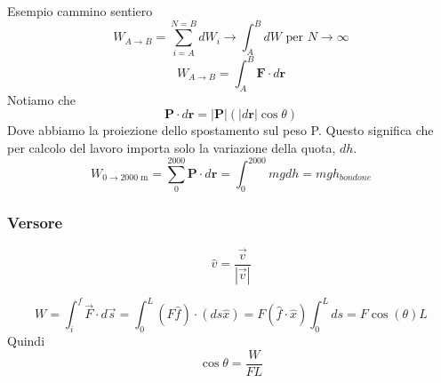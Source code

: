 Esempio cammino sentiero
\[ W_{A\to B} = \sum_{i = A}^{N = B}dW_i \to \int_{A}^{B}dW \text{ per } N\to\infty \]
\[ W_{A\to B} = \int_{A}^{B}\textbf{F}\cdot d\textbf{r} \]
Notiamo che 
\[ \textbf{P}\cdot d\textbf{r} = |\textbf{P}| (|d\textbf{r}|\cos\theta) \]
Dove abbiamo la proiezione dello spostamento sul peso P. Questo significa che
per calcolo del lavoro importa solo la variazione della quota, $dh$.
\[ W_{0\to 2000\text{ m}} = \sum_{0}^{2000}\textbf{P}\cdot d\textbf{r} = \int_{0}^{2000}mg dh = mgh_{bondone} \]

\subsubsection*{Versore}
\[ \hat{v} = \frac{\overrightarrow{v}}{|\overrightarrow{v}|} \]

\[ W = \int_{i}^{f}\overrightarrow{F}\cdot d\overrightarrow{s} = \int_{0}^{L}(F\hat{f})\cdot(ds\hat{x}) = F(\hat{f}\cdot\hat{x})\int_{0}^{L}ds = F\cos(\theta) L\]
Quindi
\[ \cos\theta = \frac{W}{FL} \]


